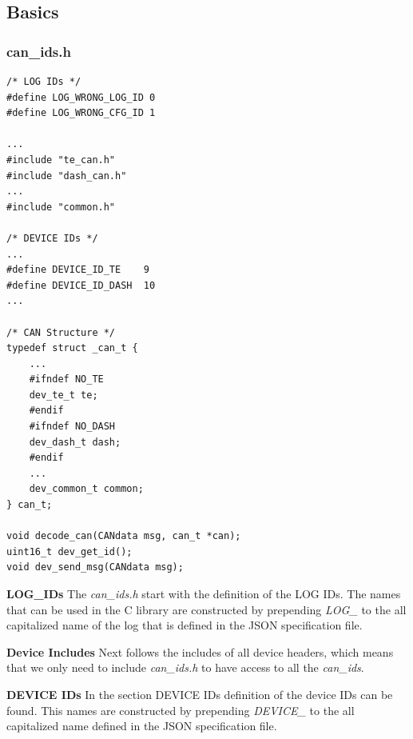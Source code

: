 \documentclass[11pt, a4paper]{article}
\begin{document}
\subsection{Basics}
\subsubsection{can\_ids.h}

\begin{verbatim}
/* LOG IDs */
#define LOG_WRONG_LOG_ID 0
#define LOG_WRONG_CFG_ID 1

...
#include "te_can.h"
#include "dash_can.h"
...
#include "common.h"

/* DEVICE IDs */
...
#define DEVICE_ID_TE	9 
#define DEVICE_ID_DASH	10 
...

/* CAN Structure */
typedef struct _can_t {
	...
	#ifndef NO_TE
	dev_te_t te;
	#endif
	#ifndef NO_DASH
	dev_dash_t dash;
	#endif
	...
	dev_common_t common;
} can_t;

void decode_can(CANdata msg, can_t *can);
uint16_t dev_get_id();
void dev_send_msg(CANdata msg);

\end{verbatim}

\par{\textbf{LOG\_IDs}} The \textit{can\_ids.h} start with the definition of
the LOG IDs. The names that can be used in the C library are constructed by
prepending \textit{LOG\_} to the all capitalized name of the log that is
defined in the JSON specification file.

\par{\textbf{Device Includes}} Next follows the includes of all device headers,
which means that we only need to include \textit{can\_ids.h} to have access to
all the \textit{can\_ids}.

\par{\textbf{DEVICE IDs}} In the section DEVICE IDs definition of the device
IDs can be found. This names are constructed by prepending \textit{DEVICE\_} to
the all capitalized name defined in the JSON specification file.
\end{document}
